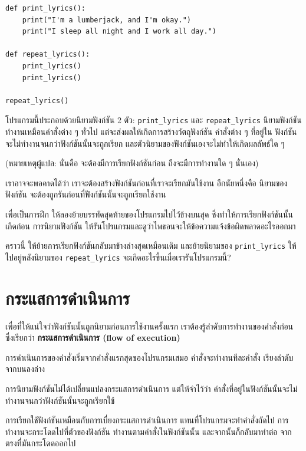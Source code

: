 \begin{verbatim}
def print_lyrics():
    print("I'm a lumberjack, and I'm okay.")
    print("I sleep all night and I work all day.")

def repeat_lyrics():
    print_lyrics()
    print_lyrics()

repeat_lyrics()
\end{verbatim}
%
โปรแกรมนี้ประกอบด้วยนิยามฟังก์ชัน 2 ตัว: \verb|print_lyrics| และ \verb|repeat_lyrics|
นิยามฟังก์ชันทำงานเหมือนคำสั่งต่าง ๆ ทั่วไป แต่จะส่งผลให้เกิดการสร้างวัตถุฟังก์ชัน  คำสั่งต่าง ๆ ที่อยู่ใน
ฟังก์ชันจะไม่ทำงานจนกว่าฟังก์ชันนั้นจะถูกเรียก และตัวนิยามของฟังก์ชันเองจะไม่ทำให้เกิดผลลัพธ์ใด ๆ 

(หมายเหตุผู้แปล: นั่นคือ จะต้องมีการเรียกฟังก์ชันก่อน ถึงจะมีการทำงานใด ๆ นั่นเอง)

เราอาจจะพอคาดได้ว่า เราจะต้องสร้างฟังก์ชันก่อนที่เราจะเรียกมันใช้งาน อีกนัยหนึ่งคือ นิยามของฟังก์ชัน
จะต้องถูกรันก่อนที่ฟังก์ชันนั้นจะถูกเรียกใช้งาน

เพื่อเป็นการฝึก ให้ลองย้ายบรรทัดสุดท้ายของโปรแกรมไปไว้ข้างบนสุด ซึ่งทำให้การเรียกฟังก์ชันนั้นเกิดก่อน
การนิยามฟังก์ชัน ให้รันโปรแกรมและดูว่าไพธอนจะให้ข้อความแจ้งข้อผิดพลาดอะไรออกมา

คราวนี้ ให้ย้ายการเรียกฟังก์ชันกลับมาข้างล่างสุดเหมือนเดิม และย้ายนิยามของ \verb|print_lyrics|
ให้ไปอยู่หลังนิยามของ \verb|repeat_lyrics| จะเกิดอะไรขึ้นเมื่อเรารันโปรแกรมนี้?


\section{กระแสการดำเนินการ} %

เพื่อที่ให้แน่ใจว่าฟังก์ชันนั้นถูกนิยามก่อนการใช้งานครั้งแรก เราต้องรู้ลำดับการทำงานของคำสั่งก่อน
ซึ่งเรียกว่า {\bf กระแสการดำเนินการ (flow of execution)}

การดำเนินการของคำสั่งเริ่มจากคำสั่งแรกสุดของโปรแกรมเสมอ
คำสั่งจะทำงานทีละคำสั่ง เรียงลำดับจากบนลงล่าง

การนิยามฟังก์ชันไม่ได้เปลี่ยนแปลงกระแสการดำเนินการ แต่ให้จำไว้ว่า
คำสั่งที่อยู่ในฟังก์ชันนั้นจะไม่ทำงานจนกว่าฟังก์ชันนั้นจะถูกเรียกใช้

การเรียกใช้ฟังก์ชันเหมือนกับการเบี่ยงกระแสการดำเนินการ แทนที่โปรแกรมจะทำคำสั่งถัดไป
การทำงานจะกระโดดไปที่ตัวของฟังก์ชัน ทำงานตามคำสั่งในฟังก์ชันนั้น และจากนั้นก็กลับมาทำต่อ
จากตรงที่มันกระโดดออกไป

